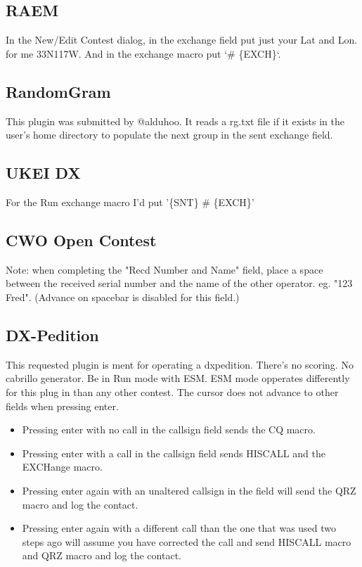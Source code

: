 \documentclass{article}
\begin{document}
\subsection{RAEM}

In the New/Edit Contest dialog, in the exchange field put just your Lat and Lon. for me 33N117W. And in the exchange macro put `\# \{EXCH\}`.

\subsection{RandomGram}

This plugin was submitted by @alduhoo. It reads a rg.txt file if it exists in the user's home directory to populate the next group in the sent exchange field.

\subsection{UKEI DX}

For the Run exchange macro I'd put '\{SNT\} \# \{EXCH\}'

\subsection{CWO Open Contest}

Note: when completing the "Recd Number and Name" field, place a space between the received serial number and the name of the other operator. eg. "123 Fred". (Advance on spacebar is disabled for this field.)

\subsection{DX-Pedition}

This requested plugin is ment for operating a dxpedition. There's no scoring. No cabrillo generator. Be in Run mode with ESM. ESM mode opperates differently for this plug in than any other contest. The cursor does not advance to other fields when pressing enter.

\begin{itemize}
    \item [] Pressing enter with no call in the callsign field sends the CQ macro.
    \item [] Pressing enter with a call in the callsign field sends HISCALL and the EXCHange macro.
    \item [] Pressing enter again with an unaltered callsign in the field will send the QRZ macro and log the contact.
    \item [] Pressing enter again with a different call than the one that was used two steps ago will assume you have corrected the call and send HISCALL macro and QRZ macro and log the contact.
\end{itemize}
\printindex
\end{document}
